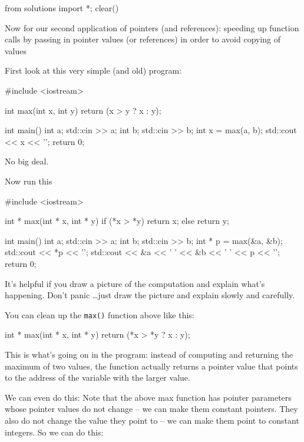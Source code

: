 \begin{python0}
from solutions import *; clear()
\end{python0}

Now for our second application of pointers (and references): speeding up function calls by passing in pointer values (or references) in order to avoid copying of values

First look at this very simple (and old) program:

\begin{consolethree}[escapeinside=||]
#include <iostream>

int max(int x, int y)
{
    return (x > y ? x : y);
}

int main()
{
    int a;
    std::cin >> a;
    int b;
    std::cin >> b;
    int x = max(a, b);
    std::cout << x << '\n';
    return 0;
}
\end{consolethree}
No big deal.

Now run this

\begin{consolethree}[escapeinside=||]
#include <iostream>

int * max(int * x, int * y)
{
    if (*x > *y)
    {
        return x;
    }
    else
    {
        return y;
    }
}

int main()
{
    int a;
    std::cin >> a;
    int b;
    std::cin >> b;
    int * p = max(&a, &b);
    std::cout << *p << '\n';
    std::cout << &a << ' ' << &b
              << ' ' << p << '\n';
    return 0;
}
\end{consolethree}
It's helpful if you draw a picture of the computation and explain what's happening. Don't panic \ldots just draw the picture and explain slowly and carefully.

You can clean up the \texttt{max()} function above like this:

\begin{consolethree}[escapeinside=||]
int * max(int * x, int * y)
{
    return (*x > *y ? x : y);
}
\end{consolethree}
This is what's going on in the program: instead of computing and returning the maximum of two values, the function actually returns a pointer value that points to the address of the variable with the larger value.

We can even do this: Note that the above max function has pointer parameters whose pointer values do not change -- we can make them constant pointers. They also do not change the value they point to -- we can make them point to constant integers. So we can do this:

